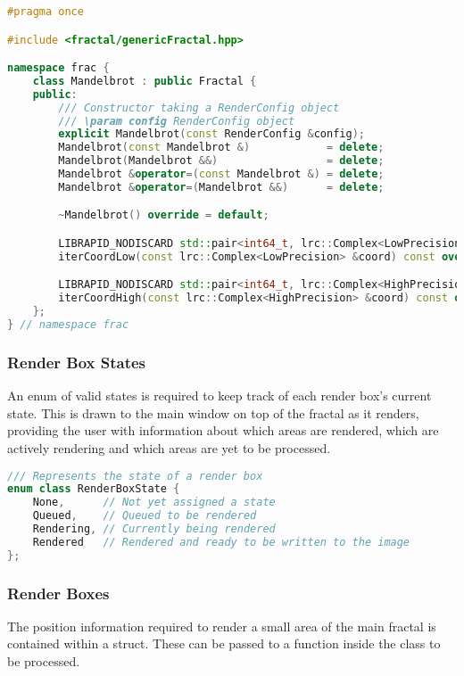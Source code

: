 \begin{lstlisting}[language=c++]
#pragma once

#include <fractal/genericFractal.hpp>

namespace frac {
	class Mandelbrot : public Fractal {
	public:
		/// Constructor taking a RenderConfig object
		/// \param config RenderConfig object
		explicit Mandelbrot(const RenderConfig &config);
		Mandelbrot(const Mandelbrot &)			  = delete;
		Mandelbrot(Mandelbrot &&)				  = delete;
		Mandelbrot &operator=(const Mandelbrot &) = delete;
		Mandelbrot &operator=(Mandelbrot &&)	  = delete;

		~Mandelbrot() override = default;

		LIBRAPID_NODISCARD std::pair<int64_t, lrc::Complex<LowPrecision>>
		iterCoordLow(const lrc::Complex<LowPrecision> &coord) const override;

		LIBRAPID_NODISCARD std::pair<int64_t, lrc::Complex<HighPrecision>>
		iterCoordHigh(const lrc::Complex<HighPrecision> &coord) const override;
	};
} // namespace frac
\end{lstlisting}

\subsubsection{Render Box States}

An enum of valid states is required to keep track of each render box's current state. This is drawn to the main window on top of the fractal as it renders, providing the user with information about which areas are rendered, which are actively rendering and which areas are yet to be processed.

\begin{lstlisting}[language=c++]
/// Represents the state of a render box
enum class RenderBoxState {
    None,	   // Not yet assigned a state
    Queued,	   // Queued to be rendered
    Rendering, // Currently being rendered
    Rendered   // Rendered and ready to be written to the image
};
\end{lstlisting}

\subsubsection{Render Boxes}

The position information required to render a small area of the main fractal is contained within a  struct. These can be passed to a function inside the  class to be processed. 

